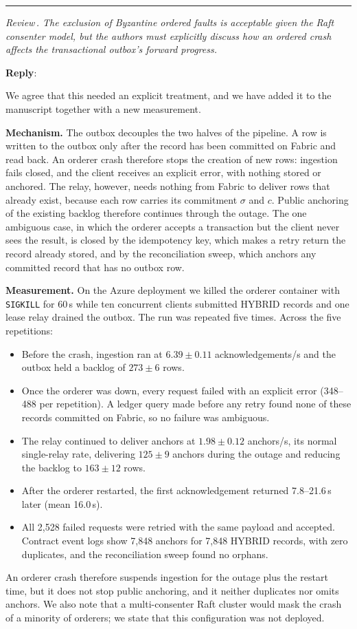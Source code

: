 \documentclass[11pt]{article}
\newcounter{reviewer}
\newcounter{point}[reviewer]
\renewcommand{\thepoint}{Review\,\thereviewer.\arabic{point}}
\newcommand{\point}[1]{\refstepcounter{point}  \bigskip \hrule \medskip \noindent \textit{{\fontseries{b}\selectfont \thepoint } #1}\par}
\newcommand{\reply}{\medskip \noindent \textbf{Reply}:\ }
\begin{document}
\point{The exclusion of Byzantine ordered faults is acceptable given the Raft consenter model, but the authors must explicitly discuss how an ordered crash affects the transactional outbox's forward progress.}

\reply{We agree that this needed an explicit treatment, and we have added it to the manuscript together with a new measurement.

\textbf{Mechanism.} The outbox decouples the two halves of the pipeline. A row is written to the outbox only after the record has been committed on Fabric and read back. An orderer crash therefore stops the creation of new rows: ingestion fails closed, and the client receives an explicit error, with nothing stored or anchored. The relay, however, needs nothing from Fabric to deliver rows that already exist, because each row carries its commitment $\sigma$ and $c$. Public anchoring of the existing backlog therefore continues through the outage. The one ambiguous case, in which the orderer accepts a transaction but the client never sees the result, is closed by the idempotency key, which makes a retry return the record already stored, and by the reconciliation sweep, which anchors any committed record that has no outbox row.

\textbf{Measurement.} On the Azure deployment we killed the orderer container with \texttt{SIGKILL} for 60\,s while ten concurrent clients submitted HYBRID records and one lease relay drained the outbox. The run was repeated five times. Across the five repetitions:
\begin{itemize}
\item Before the crash, ingestion ran at $6.39\pm0.11$ acknowledgements/s and the outbox held a backlog of $273\pm6$ rows.
\item Once the orderer was down, every request failed with an explicit error (348--488 per repetition). A ledger query made before any retry found none of these records committed on Fabric, so no failure was ambiguous.
\item The relay continued to deliver anchors at $1.98\pm0.12$ anchors/s, its normal single-relay rate, delivering $125\pm9$ anchors during the outage and reducing the backlog to $163\pm12$ rows.
\item After the orderer restarted, the first acknowledgement returned 7.8--21.6\,s later (mean 16.0\,s).
\item All 2{,}528 failed requests were retried with the same payload and accepted. Contract event logs show 7{,}848 anchors for 7{,}848 HYBRID records, with zero duplicates, and the reconciliation sweep found no orphans.
\end{itemize}
An orderer crash therefore suspends ingestion for the outage plus the restart time, but it does not stop public anchoring, and it neither duplicates nor omits anchors. We also note that a multi-consenter Raft cluster would mask the crash of a minority of orderers; we state that this configuration was not deployed.}
\end{document}
